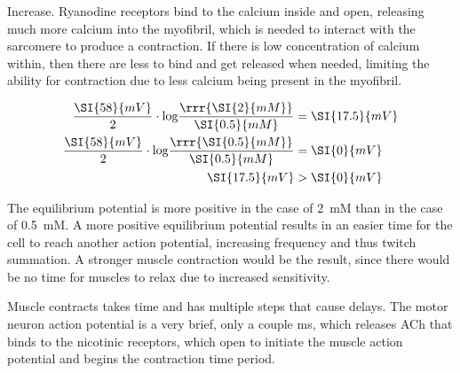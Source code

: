 \documentclass[plain,basic]{inVerba-notes}
\begin{document}
\begin{enumerate}

  Increase. Ryanodine receptors bind to the calcium inside and open, releasing much more calcium into the myofibril, which is needed to interact with the sarcomere to produce a contraction. If there is low concentration of calcium within, then there are less to bind and get released when needed, limiting the ability for contraction due to less calcium being present in the myofibril.

  \begin{align*}
    \frac{\SI{58}{mV}}{2}\cdot \text{log}\frac{\rrr{\SI{2}{mM}}}{\SI{0.5}{mM}}&=\SI{17.5}{mV} \\ 
    \frac{\SI{58}{mV}}{2}\cdot \text{log}\frac{\rrr{\SI{0.5}{mM}}}{\SI{0.5}{mM}}&=\SI{0}{mV} \\ 
    \SI{17.5}{mV} &> \SI{0}{mV} 
  \end{align*}

  The equilibrium potential is more positive in the case of \SI{2}{mM} than in the case of \SI{0.5}{mM}. A more positive equilibrium potential results in an easier time for the cell to reach another action potential, increasing frequency and thus twitch summation. A stronger muscle contraction would be the result, since there would be no time for muscles to relax due to increased sensitivity. 



  Muscle contracts takes time and has multiple steps that cause delays. The motor neuron action potential is a very brief, only a couple ms, which releases ACh that binds to the nicotinic receptors, which open to initiate the muscle action potential and begins the contraction time period.


\end{enumerate}
\end{document}
